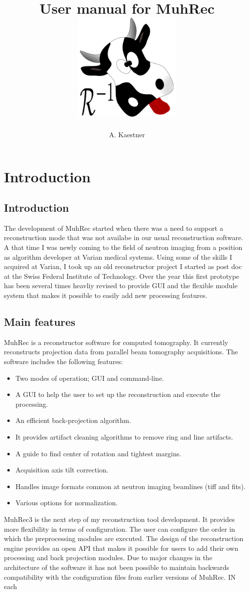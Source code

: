 \documentclass[a4paper]{scrreprt}
\title{User manual for MuhRec\\\vskip30pt\includegraphics[width=0.4\textwidth]{figures/muh_icon.pdf}}
\author{A. Kaestner}
\begin{document}
\maketitle
\tableofcontents
\chapter{Introduction}
\section{Introduction}
The development of MuhRec started when there was a need to support a reconstruction mode that was not availabe in our usual reconstruction software. A that time I was newly coming to the field of neutron imaging from a position as algorithm developer at Varian medical systems. Using some of the skills I acquired at Varian, I took up an old reconstructor project I started as post doc at the Swiss Federal Institute of Technology. Over the year this first prototype has been several times heavliy revised to provide GUI and the flexible module system that makes it possible to easily add new processing features. 

\section{Main features}
MuhRec is a reconstructor software for computed tomography. It currently reconstructs projection data from parallel beam tomography acquisitions. The software includes the following features:
\begin{itemize}
\item Two modes of operation; GUI and command-line.
\item A GUI to help the user to set up the reconstruction and execute the processing.
\item An efficient back-projection algorithm. 
\item It provides artifact cleaning algorithms to remove ring and line artifacts.
\item A guide to find center of rotation and tightest margins.
\item Acquisition axis tilt correction.
\item Handles image formats common at neutron imaging beamlines (tiff and fits).
\item Various options for normalization.
\end{itemize}

MuhRec3 is the next step of my reconstruction tool development. It provides more flexibility in terms of configuration. The user can configure the order in which the preprocessing modules are executed. The design of the reconstruction engine provides an open API that makes it possible for users to add their own processing and back projection modules. Due to major changes in the architecture of the software it has not been possible to maintain backwards compatibility with the configuration files from
earlier versions of MuhRec. IN each
\end{document}
